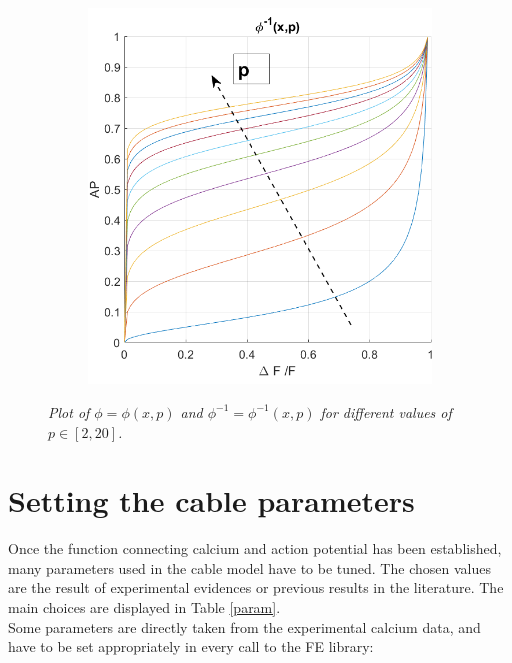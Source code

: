 \documentclass[12pt, a4paper]{report}
\begin{document}
\begin{figure}[H]
\begin{minipage}{\linewidth}
\begin{minipage}{0.45\linewidth}
\begin{figure}[H]
			\end{figure}
		\end{minipage}
		\hspace{0.05\linewidth}
		\begin{minipage}{0.45\linewidth}
			\begin{figure}[H]
				\includegraphics[width=\linewidth]{phi_inv.png}
				
			\end{figure}
		\end{minipage}
		
	\end{minipage}
	\caption{\textit{Plot of $\phi = \phi (x,p)$ and  $\phi^{-1} = \phi^{-1} (x,p)$ for different values of $p \in [2,20]$.}}
	\label{phi}
\end{figure}


\section{Setting the cable parameters}

Once the function connecting calcium and action potential has been established, many parameters used in the cable model have to be tuned. The chosen values are the result of experimental evidences or previous results in the literature. The main choices are displayed in Table \ref{param}.\\
Some parameters are directly taken from the experimental calcium data, and have to be set appropriately in every call to the FE library:
\end{document}
